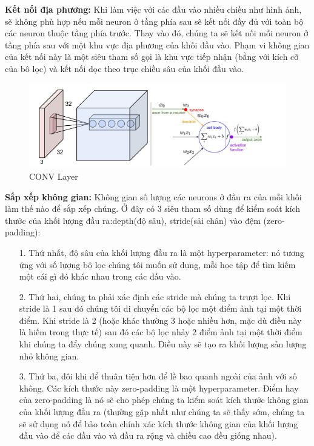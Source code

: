 \documentclass[a4paper,12pt]{report}
\begin{document}
\textbf{Kết nối địa phương:} Khi làm việc với các đầu vào nhiều chiều như hình ảnh, sẽ không phù hợp nếu mỗi neuron ở tầng phía sau sẽ kết nối đầy đủ với toàn bộ các neuron thuộc tầng phía trước. Thay vào đó, chúng ta sẽ kết nối mỗi neuron ở tầng phía sau với một khu vực địa phương của khối đầu vào. Phạm vi không gian của kết nối này là một siêu tham số gọi là khu vực tiếp nhận (bằng với kích cỡ của bô lọc) và kết nối dọc theo trục chiều sâu của khối đầu vào.
\begin{figure}[H]
\includegraphics[scale=0.7]{img2.png}
\caption{CONV Layer}
\end{figure}
\textbf{Sắp xếp không gian:} Không gian số lượng các neurons ở đầu ra của mỗi khối làm thế nào để sắp xếp chúng. Ở đây có 3 siêu tham số dùng để kiểm soát kích thước của khối lượng đầu ra:depth(độ sâu), stride(sải chân) vào đệm (zero-padding):
\begin{itemize}
\item[1. ] Thứ nhất, độ sâu của khối lượng đầu ra là một hyperparameter: nó tương ứng với số lượng bộ lọc chúng tôi muốn sử dụng, mỗi học tập để tìm kiếm một cái gì đó khác nhau trong các đầu vào.
\item[2. ] Thứ hai, chúng ta phải xác định các stride mà chúng ta trượt lọc. Khi stride là 1 sau đó chúng tôi di chuyển các bộ lọc một điểm ảnh tại một thời điểm. Khi stride là 2 (hoặc khác thường 3 hoặc nhiều hơn, mặc dù điều này là hiếm trong thực tế) sau đó các bộ lọc nhảy 2 điểm ảnh tại một thời điểm khi chúng ta đẩy chúng xung quanh. Điều này sẽ tạo ra khối lượng sản lượng nhỏ không gian.
\item[3. ] Thứ ba, đôi khi để thuân tiện hơn để lề bao quanh ngoài của ảnh với số không. Các kích thước này zero-padding là một hyperparameter. Điểm hay của zero-padding là nó sẽ cho phép chúng ta kiểm soát kích thước không gian của khối lượng đầu ra (thường gặp nhất như chúng ta sẽ thấy sớm, chúng ta sẽ sử dụng nó để bảo toàn chính xác kích thước không gian của khối lượng đầu vào để các đầu vào và đầu ra rộng và chiều cao đều giống nhau).
\end{itemize} 
\end{document}
